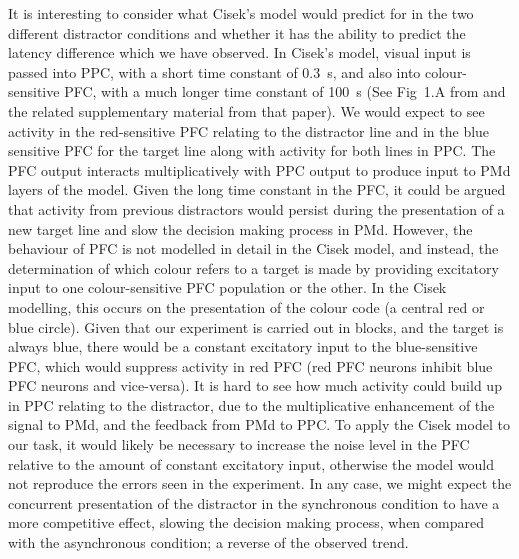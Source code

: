 \documentclass[10pt,letterpaper]{article}
\begin{document}
It is interesting to consider what Cisek's model would predict for in
the two different distractor conditions and whether it has the ability
to predict the latency difference which we have observed. In Cisek's
model, visual input is passed into PPC, with a short time constant of
0.3~s, and also into colour-sensitive PFC, with a much longer time
constant of 100~s (See Fig~1.A from \cite{cisek_integrated_2006} and
the related supplementary material from that paper). We would expect
to see activity in the
red-sensitive PFC relating to the distractor line and in the blue
sensitive PFC for the target line along with activity for both lines
in PPC. The PFC output interacts multiplicatively with PPC output to
produce input to PMd layers of the model. Given the long time constant
in the PFC, it could be argued that activity from previous distractors
would persist during the presentation of a new target line and slow
the decision making process in PMd. However, the behaviour of PFC is
not modelled in detail in the Cisek model, and instead, the
determination of which colour refers to a target is made by providing
excitatory input to one colour-sensitive PFC population or the
other. In the Cisek modelling, this occurs on the presentation of the
colour code (a central red or blue circle). Given that our experiment
is carried out in blocks, and the target is always blue, there would
be a constant excitatory input to the blue-sensitive PFC, which would
suppress activity in red PFC (red PFC neurons inhibit blue PFC neurons
and vice-versa). It is hard to see how much activity could build up in
PPC relating to the distractor, due to the multiplicative enhancement
of the signal to PMd, and the feedback from PMd to PPC. To apply the
Cisek model to our task, it would likely be necessary to increase the
noise level in the PFC relative to the amount of constant excitatory
input, otherwise the model would not reproduce the errors seen in the
experiment. In any case, we might expect the concurrent presentation
of the distractor in the synchronous condition to have a more
competitive effect, slowing the decision making process, when compared
with the asynchronous condition; a reverse of the observed trend.
\end{document}
